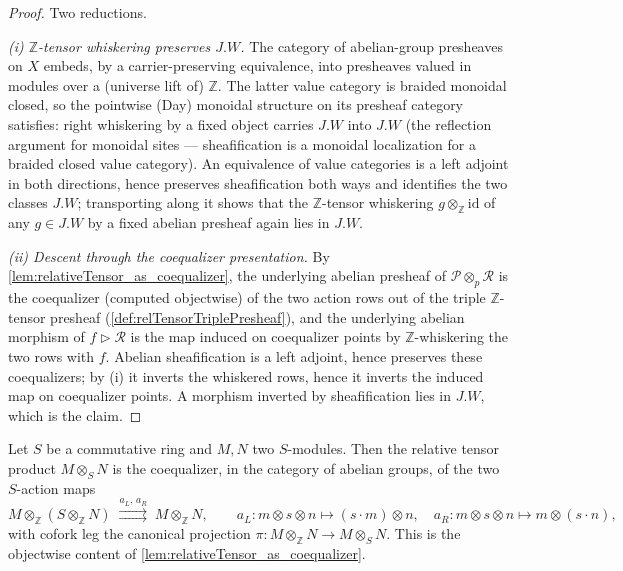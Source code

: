 \begin{proof}
    \leanok
  Two reductions.

  \emph{(i) \(\mathbb{Z}\)-tensor whiskering preserves \(J.W\).} The category
  of abelian-group presheaves on \(X\) embeds, by a carrier-preserving
  equivalence, into presheaves valued in modules over a (universe lift of)
  \(\mathbb{Z}\). The latter value category is braided monoidal closed, so the
  pointwise (Day) monoidal structure on its presheaf category satisfies: right
  whiskering by a fixed object carries \(J.W\) into \(J.W\) (the reflection
  argument for monoidal sites — sheafification is a monoidal localization for a
  braided closed value category). An equivalence of value categories is a left
  adjoint in both directions, hence preserves sheafification both ways and
  identifies the two classes \(J.W\); transporting along it shows that the
  \(\mathbb{Z}\)-tensor whiskering \(g \otimes_{\mathbb{Z}} \mathrm{id}\) of any
  \(g \in J.W\) by a fixed abelian presheaf again lies in \(J.W\).

  \emph{(ii) Descent through the coequalizer presentation.} By
  \cref{lem:relativeTensor_as_coequalizer}, the underlying abelian presheaf of
  \(\mathcal{P} \otimes_p \mathcal{R}\) is the coequalizer (computed objectwise)
  of the two action rows out of the triple \(\mathbb{Z}\)-tensor presheaf
  (\cref{def:relTensorTriplePresheaf}), and the underlying abelian morphism of
  \(f \rhd \mathcal{R}\) is the map induced on coequalizer points by
  \(\mathbb{Z}\)-whiskering the two rows with \(f\). Abelian sheafification is
  a left adjoint, hence preserves these coequalizers; by (i) it inverts the
  whiskered rows, hence it inverts the induced map on coequalizer points. A
  morphism inverted by sheafification lies in \(J.W\), which is the claim.
\end{proof}



\begin{lemma}
  \label{lem:relativeTensor_objectwise_coequalizer}
  Let \(S\) be a commutative ring and \(M, N\) two \(S\)-modules. Then the relative
  tensor product \(M \otimes_S N\) is the coequalizer, in the category of abelian
  groups, of the two \(S\)-action maps
  \[
    M \otimes_{\mathbb{Z}} (S \otimes_{\mathbb{Z}} N)
      \;\overset{a_L,\,a_R}{\rightrightarrows}\;
      M \otimes_{\mathbb{Z}} N,
    \qquad
    a_L : m \otimes s \otimes n \mapsto (s \cdot m) \otimes n,
    \quad
    a_R : m \otimes s \otimes n \mapsto m \otimes (s \cdot n),
  \]
  with cofork leg the canonical projection \(\pi : M \otimes_{\mathbb{Z}} N \to
  M \otimes_S N\). This is the objectwise content of
  \cref{lem:relativeTensor_as_coequalizer}.
\end{lemma}

